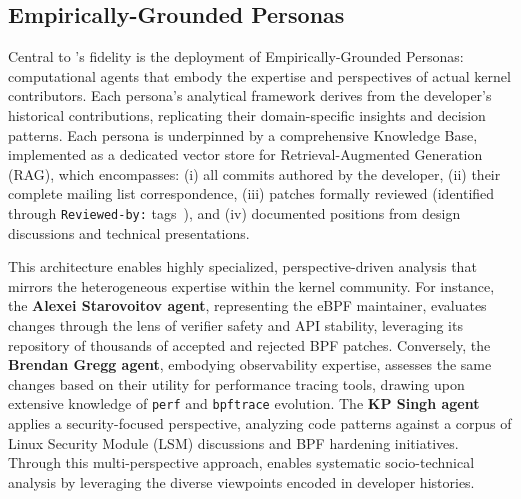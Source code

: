 \subsection{Empirically-Grounded Personas}

Central to \sys's fidelity is the deployment of Empirically-Grounded Personas: computational agents that embody the expertise and perspectives of actual kernel contributors. Each persona's analytical framework derives from the developer's historical contributions, replicating their domain-specific insights and decision patterns. Each persona is underpinned by a comprehensive Knowledge Base, implemented as a dedicated vector store for Retrieval-Augmented Generation (RAG), which encompasses: (i) all commits authored by the developer, (ii) their complete mailing list correspondence, (iii) patches formally reviewed (identified through \texttt{Reviewed-by:} tags~\cite{kerneldocs-submitting}), and (iv) documented positions from design discussions and technical presentations.

This architecture enables highly specialized, perspective-driven analysis that mirrors the heterogeneous expertise within the kernel community. For instance, the \textbf{Alexei Starovoitov agent}, representing the eBPF maintainer, evaluates changes through the lens of verifier safety and API stability, leveraging its repository of thousands of accepted and rejected BPF patches. Conversely, the \textbf{Brendan Gregg agent}, embodying observability expertise, assesses the same changes based on their utility for performance tracing tools, drawing upon extensive knowledge of \texttt{perf} and \texttt{bpftrace} evolution. The \textbf{KP Singh agent} applies a security-focused perspective, analyzing code patterns against a corpus of Linux Security Module (LSM) discussions and BPF hardening initiatives. Through this multi-perspective approach, \sys enables systematic socio-technical analysis by leveraging the diverse viewpoints encoded in developer histories.

